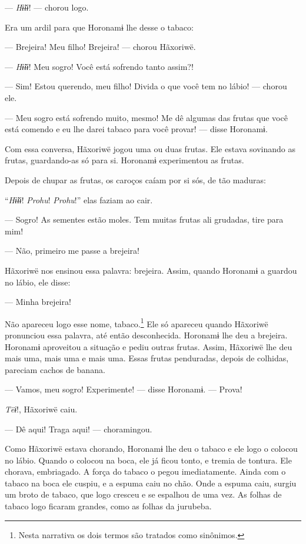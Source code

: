 --- \textit{Hɨ̃ɨɨ}! --- chorou logo. 

Era um ardil para que Horonamɨ lhe desse o tabaco: 

--- Brejeira! Meu filho! Brejeira! --- chorou Hãxoriwë. 

--- \textit{Hɨ̃ɨɨ}! Meu sogro! Você está sofrendo tanto assim?! 

--- Sim! Estou querendo, meu filho! Divida o que você tem no
lábio! --- chorou ele.

--- Meu sogro está sofrendo muito, mesmo! Me dê algumas das frutas que
você está comendo e eu lhe darei tabaco para você provar! --- disse
Horonamɨ. 

Com essa conversa, Hãxoriwë jogou uma ou duas frutas. Ele estava
 sovinando as frutas, guardando-as só para si. Horonamɨ experimentou as
 frutas.

Depois de chupar as frutas, os caroços caíam por si sós, de tão maduras:

``\textit{Hɨ̃ɨɨ}! \textit{Prohu}! \textit{Prohu}!'' elas faziam ao cair. 

--- Sogro! As sementes estão moles. Tem muitas frutas ali grudadas, tire
para mim! 

--- Não, primeiro me passe a brejeira! 

Hãxoriwë nos ensinou essa palavra: brejeira. Assim, quando Horonamɨ a
guardou no lábio, ele disse: 

--- Minha brejeira! 

Não apareceu logo esse nome, tabaco.\footnote{Nesta narrativa os dois termos 
são tratados como sinônimos.}  Ele só apareceu
quando Hãxoriwë pronunciou essa palavra, até então desconhecida.
Horonamɨ lhe deu a brejeira. Horonamɨ aproveitou a situação e pediu
outras frutas. Assim, Hãxoriwë lhe deu mais uma, mais uma e mais uma.
Essas frutas penduradas, depois de colhidas, pareciam cachos de banana. 

--- Vamos, meu sogro! Experimente! --- disse Horonamɨ. --- Prova!

\textit{Tëɨ}!, Hãxoriwë caiu. 

--- Dê aqui! Traga aqui! --- choramingou. 

Como Hãxoriwë estava chorando, Horonamɨ lhe deu o tabaco e ele
 logo o colocou no lábio. Quando o colocou na boca, ele já ficou tonto, e
 tremia de tontura. Ele chorava, embriagado. A força do tabaco o pegou
 imediatamente. Ainda com o tabaco na boca ele cuspiu, e a espuma caiu no
 chão. Onde a espuma caiu, surgiu um broto de tabaco, que logo cresceu e
 se espalhou de uma vez. As folhas de tabaco logo ficaram grandes, como as folhas da jurubeba. 

